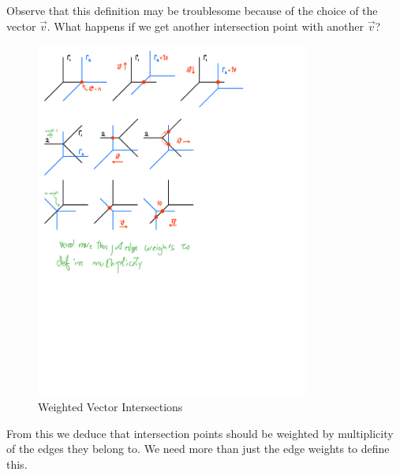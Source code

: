 \documentclass[12pt]{memoir}
\begin{document}
Observe that this definition may be troublesome because of the choice of the vector $\vec v$. What happens if we get another intersection point with another $\vec v$?

\begin{figure}[h!]
    \centering
    \includegraphics[width=0.8\textwidth, trim= 0.1cm 17.75cm 9cm 5.5cm,clip]{figs/fig11-3-4-and-5-VectorIntersections.pdf}
    \caption{Weighted Vector Intersections}
    \label{fig:11.4-WeightedVectorIntersection2}
\end{figure}
   
From this we deduce that intersection points should be weighted by multiplicity of the edges they belong to. We need more than just the edge weights to define this.
\end{document}
